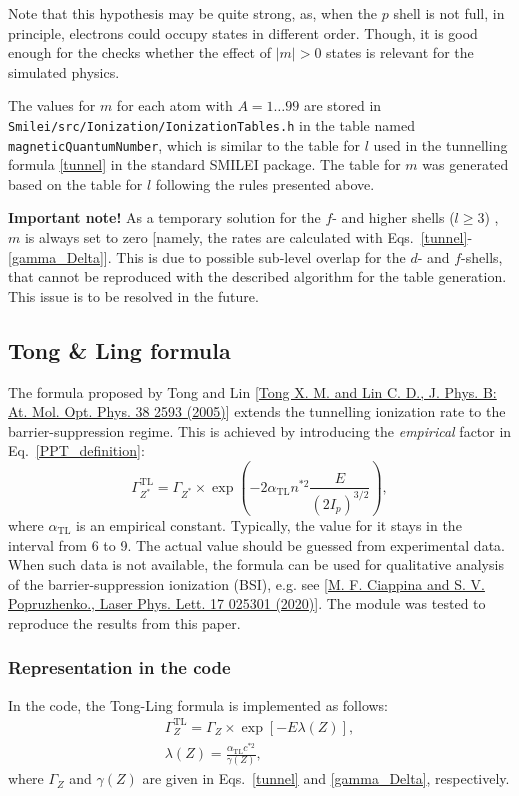 \documentclass[prd, preprint,
aps,
amsmath,
amssymb,
onecolumn,
nofootinbib,
superscriptaddress,
]{revtex4-2}
\begin{document}
	Note that this hypothesis may be quite strong, as, when the $p$ shell is not full, in principle, electrons could occupy states in different order. Though, it is good enough for the checks whether the effect of $|m|>0$ states is relevant for the simulated physics. 
	
	The values for $m$ for each atom with $A=1\ldots99$ are stored in \texttt{Smilei/src/Ionization/IonizationTables.h} in the table named \texttt{magneticQuantumNumber}, which is similar to the table for $l$ used in the tunnelling formula \eqref{tunnel} in the standard SMILEI package. The table for $m$ was generated based on the table for $l$ following the rules presented above.
	
	\textbf{Important note!} As a temporary solution for the $f$- and higher shells ($l\geq 3$) , $m$ is always set to zero [namely, the rates are calculated with Eqs.~\eqref{tunnel}-\eqref{gamma_Delta}]. This is due to possible sub-level overlap for the $d$- and $f$-shells, that cannot be reproduced with the described algorithm for the table generation. This issue is to be resolved in the future.
	
	
	\clearpage
	\subsection{Tong \& Ling formula}
	The formula proposed by Tong and Lin [\href{https://iopscience.iop.org/article/10.1088/0953-4075/38/15/001}{Tong X. M. and Lin C. D., J. Phys. B: At. Mol. Opt. Phys. 38 2593 (2005)}] extends the tunnelling ionization rate to the barrier-suppression regime. This is achieved by introducing the \textit{empirical} factor in Eq.~\eqref{PPT_definition}:
	\begin{equation}
		\Gamma_{Z^*}^{\text{TL}} = \Gamma_{Z^*}\times \exp\left( -2\alpha_{\text{TL}} n^{*2} \frac{E}{(2 I_p)^{3/2}}\right),
	\end{equation}
	where $\alpha_{\text{TL}}$ is an empirical constant. Typically, the value for it stays in the interval from 6 to 9. The actual value should be guessed from experimental data. When such data is not available, the formula can be used for qualitative analysis of the barrier-suppression ionization (BSI), e.g. see [\href{https://iopscience.iop.org/article/10.1088/1612-202X/ab6559}{M. F. Ciappina and S. V. Popruzhenko., Laser Phys. Lett. 17 025301 (2020)}]. The module was tested to reproduce the results from this paper.
	
	\subsubsection{Representation in the code}
	In the code, the Tong-Ling formula is implemented as follows:
	\begin{gather}
		\label{tonglin}
		\Gamma_{Z}^\text{TL}=\Gamma_{Z}\times \exp\left[ -E\lambda(Z) \right] ,\\
		\lambda(Z) = \frac{\alpha_{\text{TL}} c^{*2}}{\gamma(Z)},
	\end{gather}
	where $\Gamma_Z$ and $\gamma(Z)$ are given in Eqs.~\eqref{tunnel} and \eqref{gamma_Delta}, respectively.
	
\end{document}
